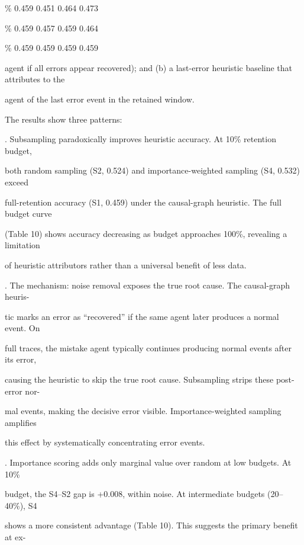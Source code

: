 \begin{flushleft}
\% 0.459 0.451 0.464 0.473\par
{}\% 0.459 0.457 0.459 0.464\par
{}\% 0.459 0.459 0.459 0.459\par
\par\smallskip
\par\smallskip
\noindent agent if all errors appear recovered); and (b) a last-error heuristic baseline that attributes to the\par
\noindent agent of the last error event in the retained window.\par
\noindent  The results show three patterns:\par
{}. Subsampling paradoxically improves heuristic accuracy. At 10\% retention budget,\par
\noindent  both random sampling (S2, 0.524) and importance-weighted sampling (S4, 0.532) exceed\par
\noindent  full-retention accuracy (S1, 0.459) under the causal-graph heuristic. The full budget curve\par
\noindent  (Table 10) shows accuracy decreasing as budget approaches 100\%, revealing a limitation\par
\noindent  of heuristic attributors rather than a universal benefit of less data.\par
{}. The mechanism: noise removal exposes the true root cause. The causal-graph heuris-\par
\noindent  tic marks an error as “recovered” if the same agent later produces a normal event. On\par
\noindent  full traces, the mistake agent typically continues producing normal events after its error,\par
\noindent  causing the heuristic to skip the true root cause. Subsampling strips these post-error nor-\par
\noindent  mal events, making the decisive error visible. Importance-weighted sampling amplifies\par
\noindent  this effect by systematically concentrating error events.\par
{}. Importance scoring adds only marginal value over random at low budgets. At 10\%\par
\noindent  budget, the S4–S2 gap is +0.008, within noise. At intermediate budgets (20–40\%), S4\par
\noindent  shows a more consistent advantage (Table 10). This suggests the primary benefit at ex-\par

\end{flushleft}
